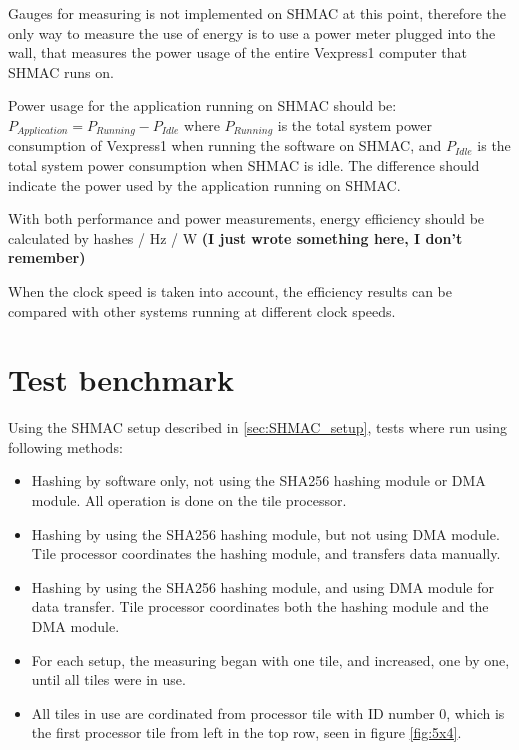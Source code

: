 Gauges for measuring is not implemented on SHMAC at this point, therefore the only way to measure the use of energy is to use a power meter plugged into the wall, that measures the power usage of the entire Vexpress1 computer that SHMAC runs on.

Power usage for the application running on SHMAC should be:
\newline
\newline$P_{Application} = P_{Running} - P_{Idle}$
\newline
\newline where $P_{Running}$ is the total system power consumption of Vexpress1 when running the software on SHMAC, and $P_{Idle}$ is the total system power consumption when SHMAC is idle.
The difference should indicate the power used by the application running on SHMAC.

With both performance and power measurements, energy efficiency should be calculated by hashes / Hz / W \textbf{(I just wrote something here, I don't remember)}

When the clock speed is taken into account, the efficiency results can be compared with other systems running at different clock speeds.

\section{Test benchmark}
Using the SHMAC setup described in \ref{sec:SHMAC_setup}, tests where run using following methods:
\begin{itemize}
    \item Hashing by software only, not using the SHA256 hashing module or DMA module.
    All operation is done on the tile processor.
    \item Hashing by using the SHA256 hashing module, but not using DMA module.
    Tile processor coordinates the hashing module, and transfers data manually.
    \item Hashing by using the SHA256 hashing module, and using DMA module for data transfer.
    Tile processor coordinates both the hashing module and the DMA module.
    \item For each setup, the measuring began with one tile, and increased, one by one, until all tiles were in use.
    \item All tiles in use are cordinated from processor tile with ID number 0, which is the first processor tile from left in the top row, seen in figure \ref{fig:5x4}.
\end{itemize}

